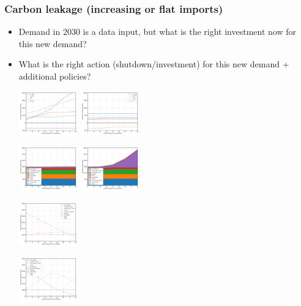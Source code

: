 \documentclass[xcolor=dvipsnames]{beamer}
\begin{document}
\begin{frame}
  \frametitle{Carbon leakage (increasing or flat imports)}

\begin{itemize}
  \item Demand in 2030 is a data input, but what is the right investment now for this new demand?
  \item What is the right action (shutdown/investment) for this new demand + additional policies?


  \includegraphics[width=0.2\textwidth]{includes/leakage_no_shutdowns_agg_exim.png}
  \includegraphics[width=0.2\textwidth]{includes/no_leakage_no_shutdowns_agg_exim.png}

  \includegraphics[width=0.2\textwidth]{includes/leakage_no_shutdowns_agg_capacity_cntlreg.png}
  \includegraphics[width=0.2\textwidth]{includes/no_leakage_no_shutdowns_agg_capacity_cntlreg.png}

  \includegraphics[width=0.2\textwidth]{includes/leakage_no_shutdowns_agg_generation_cntlreg.png}

  \includegraphics[width=0.2\textwidth]{includes/no_leakage_no_shutdowns_agg_generation_cntlreg.png}

\end{itemize}

\end{frame}
\end{document}
